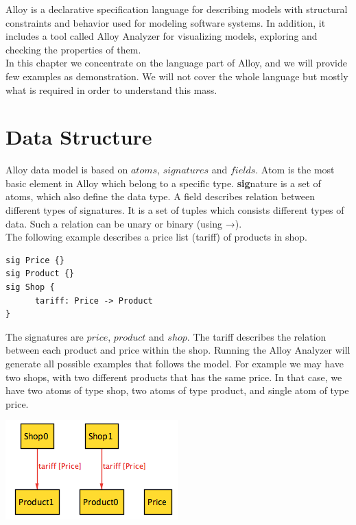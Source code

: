 \documentclass[oneside]{book}
\begin{document}
Alloy is a declarative specification language for describing models with structural constraints and behavior used for modeling software systems. In addition, it includes a tool called Alloy Analyzer for visualizing models, exploring and checking the properties of them.\\

In this chapter we concentrate on the language part of Alloy, and we will provide few examples as demonstration. We will not cover the whole language but mostly what is required in order to understand this mass.\\

\section{Data Structure}

Alloy data model is based on $atoms$, $signatures$ and $fields$. Atom is the most basic element in Alloy which belong to a specific type. \textbf{sig}nature is a set of atoms, which also define the data type. A field describes relation between different types of signatures. It is a set of tuples which consists different types of data. Such a relation can be unary or binary (using →).\\

The following example describes a price list (tariff) of products in shop. 

\begin{lstlisting}
sig Price {}
sig Product {}
sig Shop {
	  tariff: Price -> Product
}
\end{lstlisting}

The signatures are $price$, $product$ and $shop$. The tariff describes the relation between each product and price within the shop. Running the Alloy Analyzer will generate all possible examples that follows the model. For example we may have two shops, with two different products that has the same price. In that case, we have two atoms of type shop, two atoms of type product, and single atom of type price.

\begin{center}
\includegraphics[scale=0.6]{shops1}
\end{center}
\end{document}
